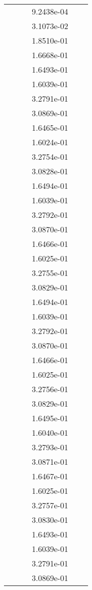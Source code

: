 \begin{xltabular}{\textwidth}{r|rS[table-format=1.3e+2]S[table-format=1.4e+2]S[table-format=1.4e+2]S[table-format=-1.5]}
&  &  & 9.2438e-04 & & \\
&  &  & 3.1073e-02 & & \\
&  &  & 1.8510e-01 & & \\
&  &  & 1.6668e-01 & & \\
&  &  & 1.6493e-01 & & \\
&  &  & 1.6039e-01 & & \\
&  &  & 3.2791e-01 & & \\
&  &  & 3.0869e-01 & & \\
&  &  & 1.6465e-01 & & \\
&  &  & 1.6024e-01 & & \\
&  &  & 3.2754e-01 & & \\
&  &  & 3.0828e-01 & & \\
&  &  & 1.6494e-01 & & \\
&  &  & 1.6039e-01 & & \\
&  &  & 3.2792e-01 & & \\
&  &  & 3.0870e-01 & & \\
&  &  & 1.6466e-01 & & \\
&  &  & 1.6025e-01 & & \\
&  &  & 3.2755e-01 & & \\
&  &  & 3.0829e-01 & & \\
&  &  & 1.6494e-01 & & \\
&  &  & 1.6039e-01 & & \\
&  &  & 3.2792e-01 & & \\
&  &  & 3.0870e-01 & & \\
&  &  & 1.6466e-01 & & \\
&  &  & 1.6025e-01 & & \\
&  &  & 3.2756e-01 & & \\
&  &  & 3.0829e-01 & & \\
&  &  & 1.6495e-01 & & \\
&  &  & 1.6040e-01 & & \\
&  &  & 3.2793e-01 & & \\
&  &  & 3.0871e-01 & & \\
&  &  & 1.6467e-01 & & \\
&  &  & 1.6025e-01 & & \\
&  &  & 3.2757e-01 & & \\
&  &  & 3.0830e-01 & & \\
&  &  & 1.6493e-01 & & \\
&  &  & 1.6039e-01 & & \\
&  &  & 3.2791e-01 & & \\
&  &  & 3.0869e-01 & & \\

\end{xltabular}
